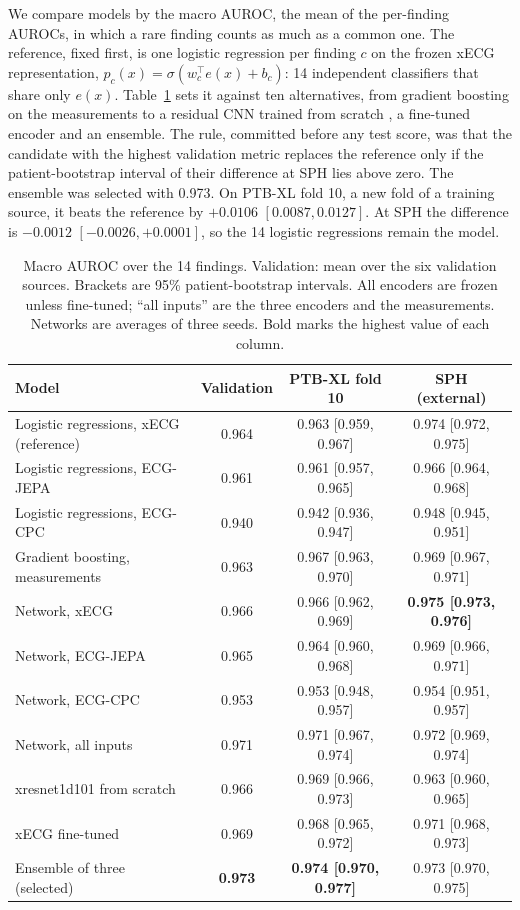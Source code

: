 \documentclass[letterpaper,11pt]{article}
\begin{document}
We compare models by the macro AUROC, the mean of the per-finding AUROCs, in which a rare finding counts as much as a common one. The reference, fixed first, is one logistic regression per finding $c$ on the frozen xECG representation, $p_c(x) = \sigma(w_c^{\top} e(x) + b_c)$: 14 independent classifiers that share only $e(x)$. Table~\ref{tab:multilabel} sets it against ten alternatives, from gradient boosting on the measurements to a residual CNN trained from scratch \parencite{strodthoff2021deep}, a fine-tuned encoder and an ensemble. The rule, committed before any test score, was that the candidate with the highest validation metric replaces the reference only if the patient-bootstrap interval of their difference at SPH lies above zero. The ensemble was selected with 0.973. On PTB-XL fold 10, a new fold of a training source, it beats the reference by $+0.0106$ $[0.0087, 0.0127]$. At SPH the difference is $-0.0012$ $[-0.0026, +0.0001]$, so the 14 logistic regressions remain the model.

\begin{table}[!htb]
  \centering
  \caption{Macro AUROC over the 14 findings. Validation: mean over the six validation sources. Brackets are 95\% patient-bootstrap intervals. All encoders are frozen unless fine-tuned; ``all inputs'' are the three encoders and the measurements. Networks are averages of three seeds. Bold marks the highest value of each column.}
  \label{tab:multilabel}
  \small
  \begin{tabular}{lccc}
    \toprule
    Model & Validation & PTB-XL fold 10 & SPH (external) \\
    \midrule
    Logistic regressions, xECG (reference) & 0.964 & 0.963 [0.959, 0.967] & 0.974 [0.972, 0.975] \\
    Logistic regressions, ECG-JEPA & 0.961 & 0.961 [0.957, 0.965] & 0.966 [0.964, 0.968] \\
    Logistic regressions, ECG-CPC & 0.940 & 0.942 [0.936, 0.947] & 0.948 [0.945, 0.951] \\
    Gradient boosting, measurements & 0.963 & 0.967 [0.963, 0.970] & 0.969 [0.967, 0.971] \\
    Network, xECG & 0.966 & 0.966 [0.962, 0.969] & \textbf{0.975 [0.973, 0.976]} \\
    Network, ECG-JEPA & 0.965 & 0.964 [0.960, 0.968] & 0.969 [0.966, 0.971] \\
    Network, ECG-CPC & 0.953 & 0.953 [0.948, 0.957] & 0.954 [0.951, 0.957] \\
    Network, all inputs & 0.971 & 0.971 [0.967, 0.974] & 0.972 [0.969, 0.974] \\
    xresnet1d101 from scratch & 0.966 & 0.969 [0.966, 0.973] & 0.963 [0.960, 0.965] \\
    xECG fine-tuned & 0.969 & 0.968 [0.965, 0.972] & 0.971 [0.968, 0.973] \\
    Ensemble of three (selected) & \textbf{0.973} & \textbf{0.974 [0.970, 0.977]} & 0.973 [0.970, 0.975] \\
    \bottomrule
  \end{tabular}
\end{table}
\end{document}
